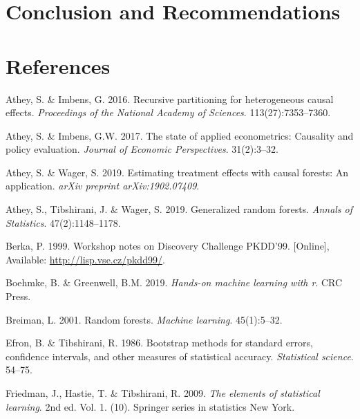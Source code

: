 \documentclass[11pt,preprint, authoryear]{elsarticle}
\numberwithin{equation}{section}
\numberwithin{figure}{section}
\numberwithin{table}{section}
\newlength{\cslhangindent}
\newenvironment{CSLReferences}%
  {\setlength{\parindent}{0pt}%
  \everypar{\setlength{\hangindent}{\cslhangindent}}\ignorespaces}%
  {\par}
\begin{document}
\hypertarget{conclusion-and-recommendations}{%
\section{Conclusion and
Recommendations}\label{conclusion-and-recommendations}}

\newpage

\hypertarget{references}{%
\section*{References}\label{references}}

\hypertarget{refs}{}
\begin{CSLReferences}{1}{0}
\leavevmode\hypertarget{ref-AtheyImbensRecursive}{}%
Athey, S. \& Imbens, G. 2016. Recursive partitioning for heterogeneous
causal effects. \emph{Proceedings of the National Academy of Sciences}.
113(27):7353--7360.

\leavevmode\hypertarget{ref-StateOfEconometrics}{}%
Athey, S. \& Imbens, G.W. 2017. The state of applied econometrics:
Causality and policy evaluation. \emph{Journal of Economic
Perspectives}. 31(2):3--32.

\leavevmode\hypertarget{ref-Athey2019Application}{}%
Athey, S. \& Wager, S. 2019. Estimating treatment effects with causal
forests: An application. \emph{arXiv preprint arXiv:1902.07409}.

\leavevmode\hypertarget{ref-AtheyGRF2019}{}%
Athey, S., Tibshirani, J. \& Wager, S. 2019. Generalized random forests.
\emph{Annals of Statistics}. 47(2):1148--1178.

\leavevmode\hypertarget{ref-Data}{}%
Berka, P. 1999. {Workshop notes on Discovery Challenge PKDD'99}.
{[}Online{]}, Available: \url{http://lisp.vse.cz/pkdd99/}.

\leavevmode\hypertarget{ref-Boehmke}{}%
Boehmke, B. \& Greenwell, B.M. 2019. \emph{Hands-on machine learning
with r}. CRC Press.

\leavevmode\hypertarget{ref-Breiman2001}{}%
Breiman, L. 2001. Random forests. \emph{Machine learning}. 45(1):5--32.

\leavevmode\hypertarget{ref-Efron}{}%
Efron, B. \& Tibshirani, R. 1986. Bootstrap methods for standard errors,
confidence intervals, and other measures of statistical accuracy.
\emph{Statistical science}. 54--75.

\leavevmode\hypertarget{ref-ESL}{}%
Friedman, J., Hastie, T. \& Tibshirani, R. 2009. \emph{The elements of
statistical learning}. 2nd ed. Vol. 1. (10). Springer series in
statistics New York.


\end{CSLReferences}
\end{document}
